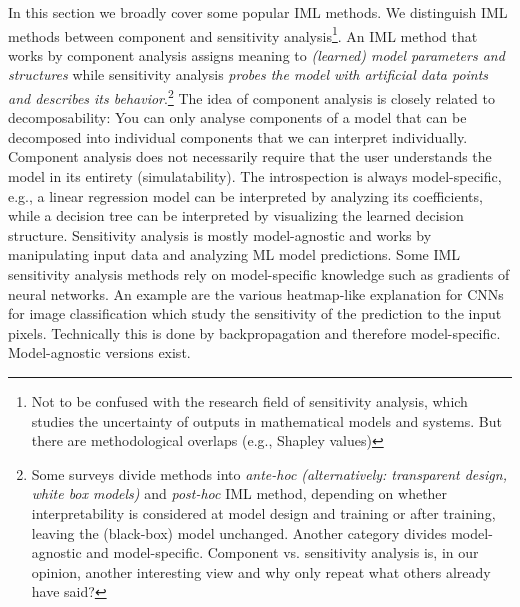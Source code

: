\documentclass[runningheads]{llncs}
\begin{document}
In this section we broadly cover some popular IML methods.
We distinguish IML methods between component and sensitivity analysis\footnote{Not to be confused with the research field of sensitivity analysis, which studies the uncertainty of outputs in mathematical models and systems. But there are methodological overlaps (e.g., Shapley values)}.
An IML method that works by component analysis assigns meaning to \textit{(learned) model parameters and structures} while sensitivity analysis \textit{probes the model with artificial data points and describes its behavior}.\footnote{Some surveys \cite{vilone2020explainable,guidotti2018survey} divide methods into \textit{ante-hoc (alternatively: transparent design, white box models)} and \textit{post-hoc} IML method, depending on whether interpretability is considered at model design and training or after training, leaving the (black-box) model unchanged. Another category divides model-agnostic and model-specific. Component vs. sensitivity analysis is, in our opinion, another interesting view and why only repeat what others already have said?}
The idea of component analysis is closely related to decomposability:
You can only analyse components of a model that can be decomposed into individual components that we can interpret individually.
Component analysis does not necessarily require that the user understands the model in its entirety (simulatability).
The introspection is always model-specific, e.g., a linear regression model can be interpreted by analyzing its coefficients, while a decision tree can be interpreted by visualizing the learned decision structure.
Sensitivity analysis is mostly model-agnostic and works by manipulating input data and analyzing ML model  predictions.
Some IML sensitivity analysis methods rely on model-specific knowledge such as gradients of neural networks. An example are the various heatmap-like explanation for CNNs for image classification \cite{sundararajan2017axiomatic,lundberg2017unified,montavon2017explaining,simonyan2013deep,shrikumar2016not} which study the sensitivity of the prediction to the input pixels. Technically this is done by backpropagation and therefore model-specific. Model-agnostic versions \cite{ribeiro2016should,lundberg2017unified,zeiler2014visualizing} exist.


\end{document}
